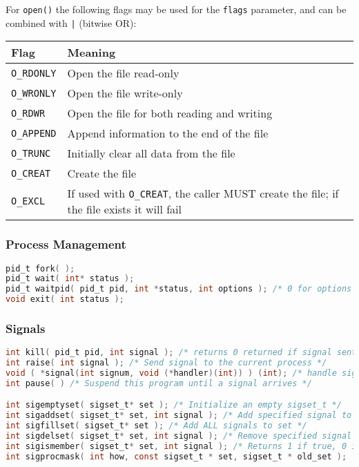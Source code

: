 \documentclass[legalpaper,10pt]{article}
\begin{document}
For \texttt{open()} the following flags may be used for the \texttt{flags} parameter, and can be combined with \texttt{|} (bitwise OR):\\
\begin{tabular}{l|l}
	\textbf{Flag} & \textbf{Meaning} \\ \hline
	\texttt{O\_RDONLY} & Open the file read-only \\ \hline
	\texttt{O\_WRONLY} & Open the file write-only \\ \hline
	\texttt{O\_RDWR} & Open the file for both reading and writing \\ \hline
	\texttt{O\_APPEND} & Append information to the end of the file \\ \hline
	\texttt{O\_TRUNC} & Initially clear all data from the file \\ \hline
	\texttt{O\_CREAT} & Create the file \\ \hline	
	\texttt{O\_EXCL} & If used with \texttt{O\_CREAT}, the caller MUST create the file; if the file exists it will fail \\ 	
\end{tabular}


\subsubsection*{Process Management}

\begin{lstlisting}[language=C]
pid_t fork( );
pid_t wait( int* status );
pid_t waitpid( pid_t pid, int *status, int options ); /* 0 for options fine */
void exit( int status );
\end{lstlisting}

\subsubsection*{Signals}

\begin{lstlisting}[language=C]
int kill( pid_t pid, int signal ); /* returns 0 returned if signal sent, -1 if an error */
int raise( int signal ); /* Send signal to the current process */
void ( *signal(int signum, void (*handler)(int)) ) (int); /* handle signal */ 
int pause( ) /* Suspend this program until a signal arrives */

int sigemptyset( sigset_t* set ); /* Initialize an empty sigset_t */
int sigaddset( sigset_t* set, int signal ); /* Add specified signal to set */
int sigfillset( sigset_t* set ); /* Add ALL signals to set */
int sigdelset( sigset_t* set, int signal ); /* Remove specified signal from set */ 
int sigismember( sigset_t* set, int signal ); /* Returns 1 if true, 0 if false */
int sigprocmask( int how, const sigset_t * set, sigset_t * old_set ); 
\end{lstlisting}
\end{document}
